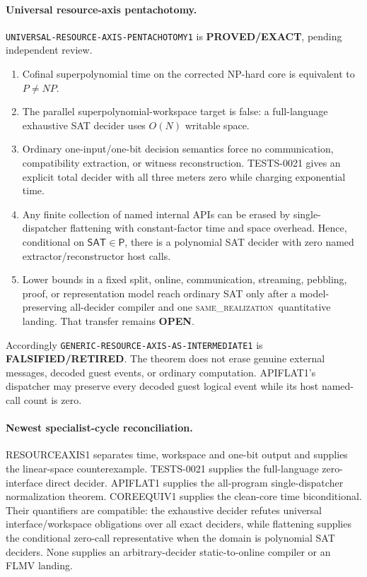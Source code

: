 \documentclass[11pt]{article}
\newcommand{\statusproved}{\textcolor{proved}{\textbf{PROVED/EXACT}}}
\newcommand{\statusopen}{\textcolor{openstatus}{\textbf{OPEN}}}
\newcommand{\statusretired}{\textcolor{retired}{\textbf{FALSIFIED/RETIRED}}}
\newcommand{\same}{\textnormal{\textsc{same\_realization}}}
\newcommand{\SAT}{\mathsf{SAT}}
\begin{document}
\paragraph{Universal resource-axis pentachotomy.}
\texttt{UNIVERSAL-RESOURCE-AXIS-PENTACHOTOMY1} is \statusproved, pending
independent review.
\begin{enumerate}
\item Cofinal superpolynomial time on the corrected NP-hard core is equivalent
to \(P\ne NP\).
\item The parallel superpolynomial-workspace target is false: a full-language
exhaustive SAT decider uses \(O(N)\) writable space.
\item Ordinary one-input/one-bit decision semantics force no communication,
compatibility extraction, or witness reconstruction.  TESTS-0021 gives an
explicit total decider with all three meters zero while charging exponential
time.
\item Any finite collection of named internal APIs can be erased by
single-dispatcher flattening with constant-factor time and space overhead.
Hence, conditional on \(\SAT\in\mathsf P\), there is a polynomial SAT decider
with zero named extractor/reconstructor host calls.
\item Lower bounds in a fixed split, online, communication, streaming,
pebbling, proof, or representation model reach ordinary SAT only after a
model-preserving all-decider compiler and one \same\ quantitative landing.
That transfer remains \statusopen.
\end{enumerate}
Accordingly \texttt{GENERIC-RESOURCE-AXIS-AS-INTERMEDIATE1} is
\statusretired.  The theorem does not erase genuine external messages,
decoded guest events, or ordinary computation.  APIFLAT1's dispatcher may
preserve every decoded guest logical event while its host named-call count is
zero.

\paragraph{Newest specialist-cycle reconciliation.}
RESOURCEAXIS1 separates time, workspace and one-bit output and supplies the
linear-space counterexample.  TESTS-0021 supplies the full-language
zero-interface direct decider.  APIFLAT1 supplies the all-program
single-dispatcher normalization theorem.  COREEQUIV1 supplies the clean-core
time biconditional.  Their quantifiers are compatible: the exhaustive decider
refutes universal interface/workspace obligations over all exact deciders,
while flattening supplies the conditional zero-call representative when the
domain is polynomial SAT deciders.  None supplies an arbitrary-decider
static-to-online compiler or an FLMV landing.
\end{document}
